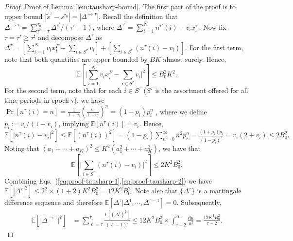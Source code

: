 \documentclass[opre]{informs3aa}
\renewcommand{\tilde}{\widetilde}
\renewcommand{\tilde}{\widetilde}
\newcommand{\ud}{\mathrm d}
\begin{document}
\begin{proof}{Proof of Lemma \ref{lem:tausharp-bound}.}
The first part of the proof is to upper bound $|\tilde s^{\tau}-s^{\tau_0}|=|\Delta^{\to\tau}|$.
Recall the definition that $\Delta^{\to\tau}=\sum_{\tau'=\tau}^{\tau_0}\Delta^{\tau'}/(\tau'-1)$, where $\Delta^{\tau'}=\sum_{i=1}^N n^{\tau'}(i)-v_ix_i^{\tau'}$.
Now fix $\tau=\tau'\geq\tau^\sharp$ and decompose $\Delta^\tau$ as $\Delta^\tau = [\sum_{i=1}^Nv_ix_i^F - \sum_{i\in S^{\tau}}v_i] + [\sum_{i\in S^{\tau}} (n^{\tau}(i) - v_i)]$. For the first term, note that both quantities are upper bounded by $BK$ almost surely. Hence,
\begin{equation}
\textstyle\mathbb E\left[\big|\sum_{i=1}^Nv_ix_i^F - \sum_{i\in S^{\tau}}v_i\big|^{2}\right]
\leq B_0^2K^2.
\label{eq:proof-tausharp-1}
\end{equation}
For the second term, note that for each $i\in S^\tau$ {($S^\tau$ is the assortment offered for all time periods in epoch $\tau$),} we have $\Pr[n^\tau(i)=n] = \frac{1}{1+v_i}\left(\frac{v_i}{1+v_i}\right)^n = (1-p_i)p_i^n$ \citep[Corollary A.1]{agrawal2019mnl}, where we define $p_i:=v_i/(1+v_i)$, implying $\mathbb E[n^\tau(i)]=v_i$. Hence, 
$\mathbb E[\big|n^\tau(i)-v_i\big|^{2}]
\leq \mathbb E[(n^\tau(i))^{2}] = (1-p_i)\sum_{n=0}^{\infty} n^{2}p_i^n
= \frac{(1+p_i)p_i}{(1-p_i)^2}=v_i(2+v_i)\leq 2B_0^2.$
Noting that $(a_1+\cdots+a_K)^2 \leq K^2(a_1^2+\cdots+a_K^2)$, we have that
\begin{equation}
\textstyle \mathbb E\left[\big|\sum_{i\in S^\tau} (n^\tau(i)-v_i)\big|^2\right] \leq 2K^2B_0^2.
\label{eq:proof-tausharp-2}
\end{equation}
Combining Eqs.~(\ref{eq:proof-tausharp-1},\ref{eq:proof-tausharp-2}) we have $\mathbb E[|\Delta^\tau|^2]\leq 2^2 \times (1 + 2) K^2 B_0^2 = 12K^2B_0^2$.
Note also that $\{\Delta^\tau\}$ is a martingale difference sequence and therefore $\mathbb E[\Delta^\tau|\Delta^1,\cdots,\Delta^{\tau-1}]=0$.
Subsequently,
\begin{align}
\mathbb E\left[\big|\Delta^{\to\tau}\big|^2\right]
&= \sum_{\ell=\tau}^{\tau_0}\frac{\mathbb E[(\Delta^\ell)^2]}{(\ell-1)^2}\leq 12K^2B_0^2\times \int_{\tau-2}^{\infty} \frac{\ud u}{u^2} = \frac{12K^2 B_0^2}{\tau-2}.
\label{eq:proof-tausharp-3}
\end{align}


\end{proof}
\end{document}

